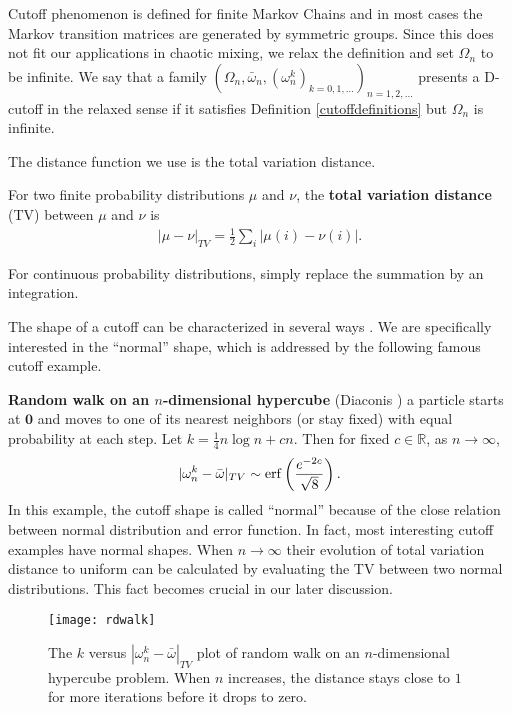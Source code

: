 Cutoff phenomenon is defined for finite Markov Chains and in most cases the Markov transition matrices are generated by symmetric groups.
Since this does not fit our applications in chaotic mixing, we relax the definition and set $\Omega_n$ to be infinite. We say that
a family $(\Omega_n,\bar{\omega}_n, (\omega^k_n)_{k=0,1,\ldots})_{n=1,2,\ldots}$ presents a D-cutoff in the relaxed sense if it satisfies
Definition \ref{cutoffdefinitions} but $\Omega_n$ is infinite. 

The distance function we use is the total variation distance.
\begin{definition} For two finite probability distributions $\mu$ and $\nu$, the \textbf{total variation
distance} (TV) between $\mu$ and $\nu$ is
  \begin{eqnarray*}
   |\mu - \nu|_{TV} = \frac{1}{2}\sum_{i} |\mu(i)-\nu(i) |.
  \end{eqnarray*}
\end{definition}
For continuous probability distributions, simply replace the summation by an integration.


The shape of a cutoff can be characterized in several ways \cite{Chen2006}. We are specifically interested in the
``normal'' shape, which is addressed by the following famous cutoff example.

\begin{example} \textbf{Random walk on an $n$-dimensional hypercube} (Diaconis \cite{Diaconis1990})
a particle starts at $\mathbf{0}$ and moves to one of its nearest neighbors (or stay fixed) with equal probability at each step. Let $k =
\frac{1}{4}n\log{n}+cn$. Then for fixed $c \in \mathbb{R}$, as $n \to \infty$,
\begin{eqnarray}
\label{rdwalkshape}
 |\omega^k_n - \bar{\omega} |_{TV} \sim \operatorname{erf} \left(\frac{e^{-2c}}{\sqrt{8}}\right).
\end{eqnarray}
In this example, the cutoff shape is called ``normal'' because of the close relation between normal distribution and error function. In fact, most interesting cutoff examples have normal shapes. When $n \to \infty$ their evolution of total variation distance to uniform can be calculated by evaluating the TV between two normal distributions. This fact becomes crucial in our later discussion. 






\begin{figure}
\centerline{\texttt{[image: rdwalk]}} \caption{The $k$
versus $|\omega_n^k-\bar{\omega}|_{TV}$ plot of random walk on an $n$-dimensional hypercube
problem. When $n$ increases, the distance stays close to $1$ for more iterations before it drops to
zero. }
\end{figure}

\end{example}

